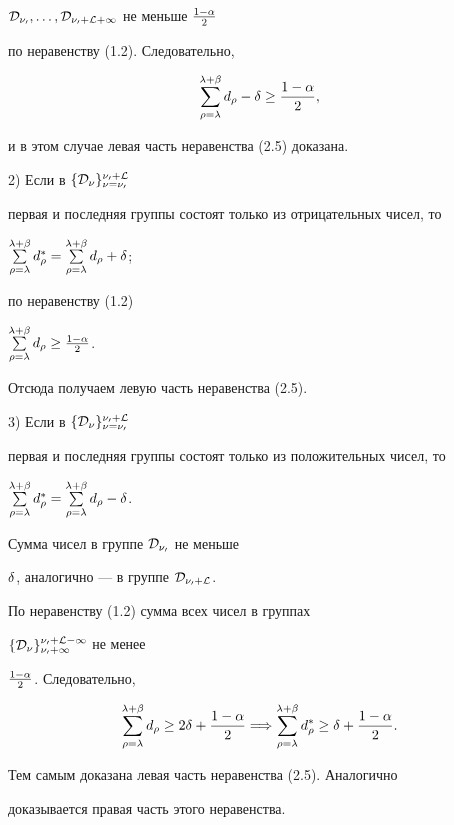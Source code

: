 \begin{pf}
$\cal D_{\nu_0}, \dotsc, \cal D_{\nu_0+L+1}$ не меньше $\frac{1-\alpha}{2}$


по неравенству (1.2). Следовательно,


$$


\sum_{\rho=\la}^{\la+\beta}d_{\rho}-\de \ge \frac{1-\al}{2},


$$


и в этом случае левая часть неравенства (2.5) доказана.





2) Если в $\{\cal D_{\nu}\}_{\nu=\nu_0}^{\nu_0+L}$


первая и последняя группы состоят только из отрицательных чисел, то


$\sum\limits_{\rho=\la}^{\la+\beta}d_{\rho}^*


=\sum\limits_{\rho=\la}^{\la+\beta}d_{\rho}+\de$;


по неравенству (1.2)\;


$\sum\limits_{\rho=\lambda}^{\lambda+\beta}d_{\rho} \ge \frac{1-\alpha}{2}$.


Отсюда получаем левую часть неравенства (2.5).





3) Если в $\{\cal D_{\nu}\}_{\nu=\nu_0}^{\nu_0+L}$


первая и последняя группы состоят только из положительных чисел, то


$\sum\limits_{\rho=\la}^{\la+\beta}d_{\rho}^*


=\sum\limits_{\rho=\la}^{\la+\beta}d_{\rho}-\de$.


Сумма чисел в группе $\cal D_{\nu_0}$ не меньше


$\delta$, аналогично --- в группе $\cal D_{\nu_0+L}$.


По неравенству (1.2) сумма всех чисел в группах


$\{\cal D_{\nu}\}_{\nu_0+1}^{\nu_0+L-1}$ не менее


$\frac{1-\alpha}{2}$. Следовательно,


$$


\sum_{\rho=\la}^{\la+\beta}d_{\rho}\ge 2\de+\frac{1-\al}{2}\Longrightarrow


\sum_{\rho=\la}^{\la+\beta}d_{\rho}^*\ge \de+\frac{1-\al}{2}.


$$


Тем самым доказана левая часть неравенства (2.5). Аналогично


доказывается правая часть этого неравенства.






\end{pf}
